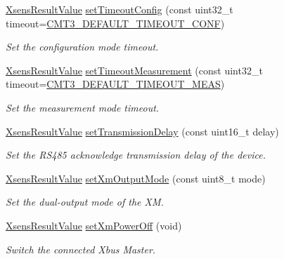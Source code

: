 \begin{DoxyCompactItemize}
\item 
\hyperlink{group__enums_ga822a2260a20af524029eef9e9a51ff6f}{\-Xsens\-Result\-Value} \hyperlink{classxsens_1_1Cmt3_a9a85e25d1d2ade56b91ab5c65111c048}{set\-Timeout\-Config} (const uint32\-\_\-t timeout=\hyperlink{cmtdef_8h_a8bebce6c8dc77704441dc7a29616c0c6}{\-C\-M\-T3\-\_\-\-D\-E\-F\-A\-U\-L\-T\-\_\-\-T\-I\-M\-E\-O\-U\-T\-\_\-\-C\-O\-N\-F})
\begin{DoxyCompactList}\small\item\em \-Set the configuration mode timeout. \end{DoxyCompactList}\item 
\hyperlink{group__enums_ga822a2260a20af524029eef9e9a51ff6f}{\-Xsens\-Result\-Value} \hyperlink{classxsens_1_1Cmt3_a9bab5d3e043d041492d367a3a70077b0}{set\-Timeout\-Measurement} (const uint32\-\_\-t timeout=\hyperlink{cmtdef_8h_af46f7189701a1534bcf3dfcecda952c9}{\-C\-M\-T3\-\_\-\-D\-E\-F\-A\-U\-L\-T\-\_\-\-T\-I\-M\-E\-O\-U\-T\-\_\-\-M\-E\-A\-S})
\begin{DoxyCompactList}\small\item\em \-Set the measurement mode timeout. \end{DoxyCompactList}\item 
\hyperlink{group__enums_ga822a2260a20af524029eef9e9a51ff6f}{\-Xsens\-Result\-Value} \hyperlink{classxsens_1_1Cmt3_afa818364d3699d057a3878128adf5c0c}{set\-Transmission\-Delay} (const uint16\-\_\-t delay)
\begin{DoxyCompactList}\small\item\em \-Set the \-R\-S485 acknowledge transmission delay of the device. \end{DoxyCompactList}\item 
\hyperlink{group__enums_ga822a2260a20af524029eef9e9a51ff6f}{\-Xsens\-Result\-Value} \hyperlink{classxsens_1_1Cmt3_a00a7f82df3fc8c91006335eb3f8b37bd}{set\-Xm\-Output\-Mode} (const uint8\-\_\-t mode)
\begin{DoxyCompactList}\small\item\em \-Set the dual-\/output mode of the \-X\-M. \end{DoxyCompactList}\item 
\hyperlink{group__enums_ga822a2260a20af524029eef9e9a51ff6f}{\-Xsens\-Result\-Value} \hyperlink{classxsens_1_1Cmt3_ae4af9817b451a22f9630ff9f9d1c4990}{set\-Xm\-Power\-Off} (void)
\begin{DoxyCompactList}\small\item\em \-Switch the connected \-Xbus \-Master. \end{DoxyCompactList}\item 

\end{DoxyCompactItemize}

